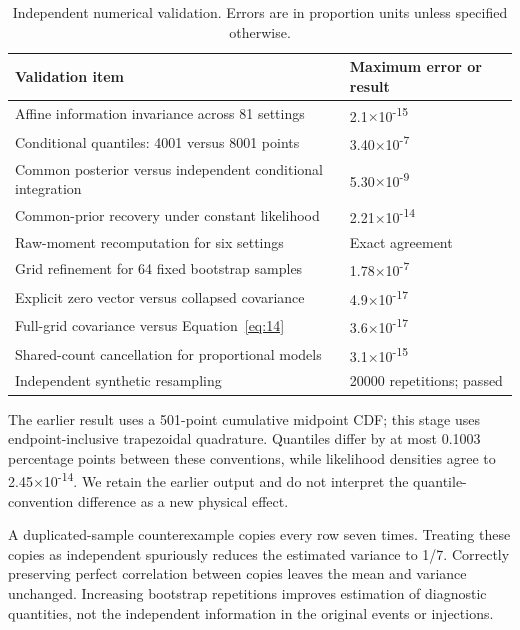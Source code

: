 \documentclass[a4paper,11pt]{article}
\begin{document}
\begin{table}[tbp]
\centering\small
\caption{Independent numerical validation. Errors are in proportion units unless specified otherwise.}\label{tab:5}
\begin{tabularx}{\linewidth}{YY}
\toprule
Validation item & Maximum error or result \\
\midrule
Affine information invariance across 81 settings & 2.1\(\times\)10\textsuperscript{-15} \\
Conditional quantiles: 4001 versus 8001 points & 3.40\(\times\)10\textsuperscript{-7} \\
Common posterior versus independent conditional integration & 5.30\(\times\)10\textsuperscript{-9} \\
Common-prior recovery under constant likelihood & 2.21\(\times\)10\textsuperscript{-14} \\
Raw-moment recomputation for six settings & Exact agreement \\
Grid refinement for 64 fixed bootstrap samples & 1.78\(\times\)10\textsuperscript{-7} \\
Explicit zero vector versus collapsed covariance & 4.9\(\times\)10\textsuperscript{-17} \\
Full-grid covariance versus Equation~\eqref{eq:14} & 3.6\(\times\)10\textsuperscript{-17} \\
Shared-count cancellation for proportional models & 3.1\(\times\)10\textsuperscript{-15} \\
Independent synthetic resampling & 20000 repetitions; passed \\
\bottomrule
\end{tabularx}
\end{table}
The earlier result uses a 501-point cumulative midpoint CDF; this stage uses endpoint-inclusive trapezoidal quadrature. Quantiles differ by at most 0.1003 percentage points between these conventions, while likelihood densities agree to 2.45\(\times\)10\textsuperscript{-14}. We retain the earlier output and do not interpret the quantile-convention difference as a new physical effect.

A duplicated-sample counterexample copies every row seven times. Treating these copies as independent spuriously reduces the estimated variance to 1/7. Correctly preserving perfect correlation between copies leaves the mean and variance unchanged. Increasing bootstrap repetitions improves estimation of diagnostic quantities, not the independent information in the original events or injections.
\end{document}
